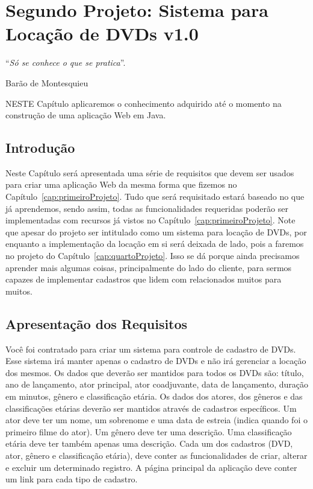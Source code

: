 \chapter{Segundo Projeto: Sistema para Locação de DVDs v1.0}\label{cap:segundoProjeto}
\epigraph{``\textit{Só se conhece o que se pratica}''.}{Barão de Montesquieu}

\lettrine[lines=4, lhang=0.1, lraise=0, loversize=0.2, findent=0.1em]{\textcolor{corTema}{N}}{ESTE} Capítulo aplicaremos o conhecimento adquirido até o momento na construção de uma aplicação Web em Java.


\section{Introdução}

Neste Capítulo será apresentada uma série de requisitos que devem ser usados para criar uma aplicação Web da mesma forma que fizemos no Capítulo~\ref{cap:primeiroProjeto}. Tudo que será requisitado estará baseado no que já aprendemos, sendo assim, todas as funcionalidades requeridas poderão ser implementadas com recursos já vistos no Capítulo~\ref{cap:primeiroProjeto}. Note que apesar do projeto ser intitulado como um sistema para locação de DVDs, por enquanto a implementação da locação em si será deixada de lado, pois a faremos no projeto do Capítulo~\ref{cap:quartoProjeto}. Isso se dá porque ainda precisamos aprender mais algumas coisas, principalmente do lado do cliente, para sermos capazes de implementar cadastros que lidem com relacionados muitos para muitos.


\section{Apresentação dos Requisitos}

Você foi contratado para criar um sistema para controle de cadastro de DVDs. Esse sistema irá manter apenas o cadastro de DVDs e não irá gerenciar a locação dos mesmos. Os dados que deverão ser mantidos para todos os DVDs são: título, ano de lançamento, ator principal, ator coadjuvante, data de lançamento, duração em minutos, gênero e classificação etária. Os dados dos atores, dos gêneros e das classificações etárias deverão ser mantidos através de cadastros específicos. Um ator deve ter um nome, um sobrenome e uma data de estreia (indica quando foi o primeiro filme do ator). Um gênero deve ter uma descrição. Uma classificação etária deve ter também apenas uma descrição. Cada um dos cadastros (DVD, ator, gênero e classificação etária), deve conter as funcionalidades de criar, alterar e excluir um determinado registro. A página principal da aplicação deve conter um link para cada tipo de cadastro.


